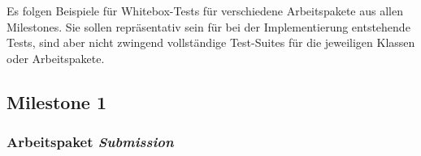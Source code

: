 \lstset{
    language=Java,
    basicstyle=\ttfamily\selectfont\scriptsize,
}

Es folgen Beispiele für Whitebox-Tests für verschiedene Arbeitspakete aus allen Milestones.
Sie sollen repräsentativ sein für bei der Implementierung entstehende Tests, sind aber nicht zwingend vollständige
Test-Suites für die jeweiligen Klassen oder Arbeitspakete.

\subsection{Milestone 1}

\subsubsection{Arbeitspaket \emph{Submission}}
